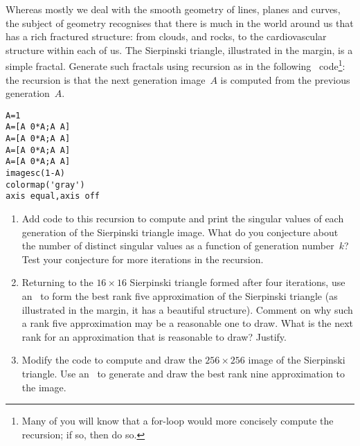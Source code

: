 \begin{exercise} \label{ex:siertri} 
Whereas mostly we deal with the smooth geometry of lines, planes and curves, 
the subject of  geometry recognises that there is much in the world around us that has a rich fractured structure: from clouds, and rocks, to the cardiovascular structure within each of us.
\marginpar{}
The Sierpinski triangle, illustrated in the margin, is a simple fractal.
Generate such fractals using recursion as in the following \script\ code\footnote{Many of you will know that a for-loop would more concisely compute the recursion; if so, then do so.}:
the recursion is that the next generation image~\(A\) is computed from the previous generation~\(A\).
\begin{verbatim}
A=1
A=[A 0*A;A A]
A=[A 0*A;A A]
A=[A 0*A;A A]
A=[A 0*A;A A]
imagesc(1-A)
colormap('gray')
axis equal,axis off
\end{verbatim}
\setbox\ajrqrbox\hbox{}%
\marginpar{\usebox{\ajrqrbox\\[2ex]}}%
\begin{enumerate}
\item Add code to this recursion to compute and print the singular values of each generation of the Sierpinski triangle image.
What do you conjecture about the number of distinct singular values as a function of generation number~\(k\)?
Test your conjecture for more iterations in the recursion.

\item Returning to the \(16\times16\) Sierpinski triangle formed after four iterations, use an \svd\ to form the best rank five approximation of the Sierpinski triangle (as illustrated in the margin, it has a beautiful structure).  
\marginpar{}%
Comment on why such a rank five approximation may be a reasonable one to draw.  
What is the next rank for an approximation that is reasonable to draw?  Justify.

\item Modify the code to compute and draw the \(256\times256\) image of the Sierpinski triangle.
Use an \svd\ to generate and draw the best rank nine approximation to the image.
\end{enumerate}
\end{exercise}



